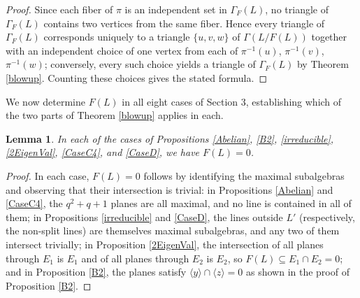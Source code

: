 \documentclass[11pt]{amsart}
\theoremstyle{plain}
\newtheorem{lemma}[theorem]{Lemma}
\begin{document}
\begin{proof}
Since each fiber of $\pi$ is an independent set in $\Gamma_F(L)$, no triangle
of $\Gamma_F(L)$ contains two vertices from the same fiber. Hence every
triangle of $\Gamma_F(L)$ corresponds uniquely to a triangle $\{u,v,w\}$ of
$\Gamma(L/F(L))$ together with an independent choice of one vertex from each
of $\pi^{-1}(u)$, $\pi^{-1}(v)$, $\pi^{-1}(w)$; conversely, every such
choice yields a triangle of $\Gamma_F(L)$ by Theorem \ref{blowup}.
Counting these choices gives the stated formula.
\end{proof}

We now determine $F(L)$ in all eight cases of Section 3, establishing which
of the two parts of Theorem \ref{blowup} applies in each.

\begin{lemma}\label{frattini-zero}
In each of the cases of Propositions \ref{Abelian}, \ref{B2}, \ref{irreducible}, \ref{2EigenVal}, \ref{CaseC4}, and \ref{CaseD}, we have $F(L) = 0$.
\end{lemma}

\begin{proof}
In each case, $F(L) = 0$ follows by identifying the maximal subalgebras and
observing that their intersection is trivial: in Propositions \ref{Abelian} and \ref{CaseC4}, the $q^2+q+1$ planes are all maximal, and no line is contained in all of them; in Propositions \ref{irreducible} and \ref{CaseD}, the lines outside $L'$ (respectively, the non-split lines) are themselves maximal subalgebras, and
any two of them intersect trivially; in Proposition \ref{2EigenVal}, the
intersection of all planes through $E_1$ is $E_1$ and of all planes through
$E_2$ is $E_2$, so $F(L) \subseteq E_1 \cap E_2 = 0$; and in Proposition \ref{B2}, the planes satisfy $\langle y \rangle \cap \langle z \rangle = 0$ as shown in the proof of Proposition \ref{B2}.
\end{proof}
\end{document}
